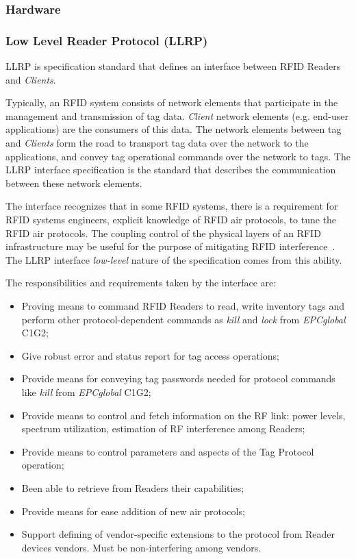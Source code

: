 \subsubsection{Hardware}

\subsubsection{Low Level Reader Protocol (LLRP)}

\gls{LLRP} is specification standard that defines an interface between \gls{RFID} Readers and \emph{Clients}.

Typically, an RFID system consists of network elements that participate in the management and transmission of tag data.
\emph{Client} network elements (e.g. end-user applications) are the consumers of this data.
The network elements between tag and \emph{Clients} form the road to transport tag data over the network to the applications, and convey tag operational commands over the network to tags.
The \gls{LLRP} interface specification is the standard that describes the communication between these network elements.


The interface recognizes that in some RFID systems, there is a requirement for RFID systems engineers, explicit knowledge of RFID air protocols, to tune the RFID air protocols. 
The coupling control of the physical layers of an RFID infrastructure may be useful for the purpose of mitigating RFID interference~\cite{Llrp1standard20101013Pdf}.
The \gls{LLRP} interface \emph{low-level} nature of the specification comes from this ability.

The responsibilities and requirements taken by the interface are:

\begin{itemize}
    \setlength{\parskip}{0pt}
    \setlength{\itemsep}{0pt}
    \item Proving means to command \gls{RFID} Readers to read, write inventory tags and perform other protocol-dependent commands as \emph{kill} and \emph{lock} from \emph{EPCglobal} \gls{C1G2};
    \item Give robust error and status report for tag access operations;
    \item Provide means for conveying tag passwords needed for protocol commands like \emph{kill} from \emph{EPCglobal} \gls{C1G2};
    \item Provide means to control and fetch information on the \gls{RF} link: power levels, spectrum utilization, estimation of \gls{RF} interference among Readers;
    \item Provide means to control parameters and aspects of the Tag Protocol operation;
    \item Been able to retrieve from Readers their capabilities;
    \item Provide means for ease addition of new air protocols;
    \item Support defining of vendor-specific extensions to the protocol from Reader devices vendors. Must be non-interfering  among vendors.
\end{itemize}

